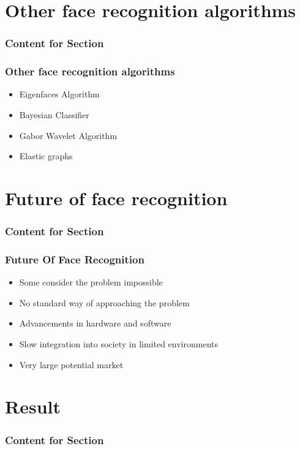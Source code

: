 \documentclass[xcolor=dvipsnames]{beamer}
\begin{document}
    \section{Other face recognition algorithms}
    \begin{frame}
      \frametitle{Content for Section \thesection}
      \tableofcontents[currentsection]
    \end{frame}
    
    \begin{frame}
    \frametitle{Other face recognition algorithms}
    \begin{itemize}
    \item Eigenfaces Algorithm
    \item Bayesian Classifier
    \item Gabor Wavelet Algorithm
    \item Elastic graphs  
    \end{itemize}
    \end{frame}
    
    \section{Future of face recognition}
    \begin{frame}
      \frametitle{Content for Section \thesection}
      \tableofcontents[currentsection]
    \end{frame}
    
     \begin{frame}
    \frametitle{Future Of Face Recognition}
    \begin{itemize}
    \item Some consider the problem impossible
    \item No standard way of approaching the problem
    \item Advancements in hardware and software
    \item Slow integration into society in limited environments
    \item Very large potential market  
    \end{itemize}
    \end{frame}
    
    \section{Result}	
    \begin{frame}
      \frametitle{Content for Section \thesection}
      \tableofcontents[currentsection]
    \end{frame}
    
\end{document}
